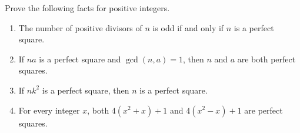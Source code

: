 Prove the following facts for positive integers.
\begin{enumerate}
\item The number of positive divisors of $n$ is odd if and only if $n$ is a perfect square.
\item If $na$ is a perfect square and $\gcd(n,a)=1$, then $n$ and $a$ are both perfect squares.
\item If $nk^2$ is a perfect square, then $n$ is a perfect square.
\item For every integer $x$, both $4(x^2+x)+1$ and $4(x^2-x)+1$ are perfect squares.
\end{enumerate}
